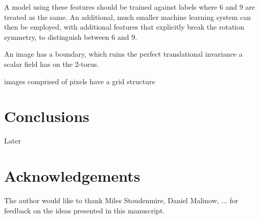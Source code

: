 \documentclass[twocolumn, prl]{revtex4-1}
\begin{document}
A model using these features should be trained against labels where 6 and 9 are treated as the same. An additional, much smaller 
machine learning system can then be employed, with additional features that explicitly break the rotation symmetry, to distinguish 
between 6 and 9.


An image has a boundary, which ruins the perfect translational invariance a scalar field has on the 2-torus.


 images comprised of pixels have a grid structure



\section{Conclusions}
\label{Sec:Conclusions}

Later

\section{Acknowledgements}

The author would like to thank Miles Stoudenmire, Daniel Malinow, ... 
for feedback on the ideas presented in this manuscript.


\vskip -0.2in

%


%



\vskip 0.2in
\end{document}
